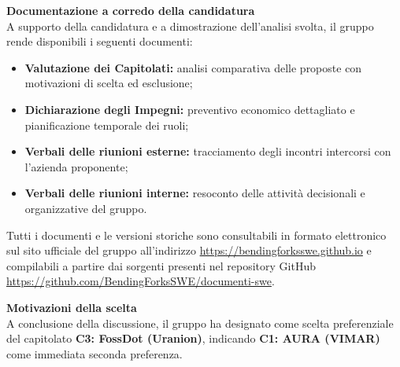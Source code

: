 \documentclass[11pt,a4paper]{article}
\newcommand{\urlRepo}{https://github.com/BendingForksSWE/documenti-swe}
\newcommand{\urlSito}{https://bendingforksswe.github.io}
\newcommand{\tightlist}{\setlength{\itemsep}{2pt}\setlength{\parskip}{0pt}}
\begin{document}
\noindent
\textbf{Documentazione a corredo della candidatura}\\
A supporto della candidatura e a dimostrazione dell'analisi svolta, il gruppo rende disponibili i seguenti documenti:
\begin{itemize}\tightlist
  \item \textbf{Valutazione dei Capitolati:} analisi comparativa delle proposte con motivazioni di scelta ed esclusione;
  \item \textbf{Dichiarazione degli Impegni:} preventivo economico dettagliato e pianificazione temporale dei ruoli;
  \item \textbf{Verbali delle riunioni esterne:} tracciamento degli incontri intercorsi con l'azienda proponente;
  \item \textbf{Verbali delle riunioni interne:} resoconto delle attività decisionali e organizzative del gruppo.
\end{itemize}

Tutti i documenti e le versioni storiche sono consultabili in formato elettronico sul sito ufficiale del gruppo all'indirizzo \url{\urlSito} e compilabili a partire dai sorgenti presenti nel repository GitHub \url{\urlRepo}.

\vspace{2mm}
\noindent
\textbf{Motivazioni della scelta}\\
A conclusione della discussione, il gruppo ha designato come scelta preferenziale del capitolato \textbf{C3: FossDot (Uranion)}, indicando \textbf{C1: AURA (VIMAR)} come immediata seconda preferenza.
\end{document}
